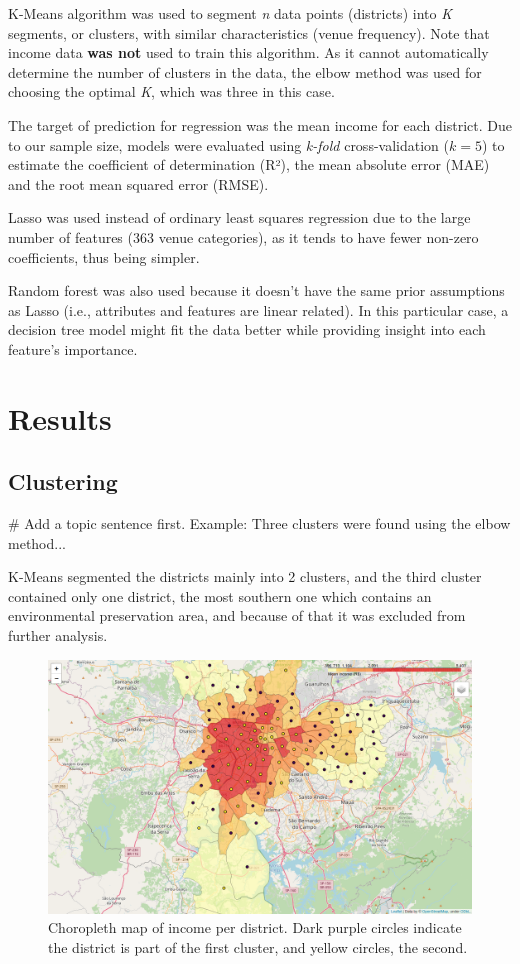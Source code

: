 \documentclass[12pt]{article}
\begin{document}
K-Means algorithm was used to segment \emph{n} data points (districts) into
\emph{K} segments, or clusters, with similar characteristics (venue frequency).
Note that income data \textbf{was not} used to train this algorithm. As it
cannot automatically determine the number of clusters in the data, the elbow
method was used for choosing the optimal \emph{K}, which was three in this
case.


The target of prediction for regression was the mean income for each district.
Due to our sample size, models were evaluated using \emph{k-fold}
cross-validation (\(k=5\)) to estimate the coefficient of determination (R²),
the mean absolute error (MAE) and the root mean squared error (RMSE).

Lasso was used instead of ordinary least squares regression due to the large
number of features (363 venue categories), as it tends to have fewer non-zero
coefficients, thus being simpler.

Random forest was also used because it doesn't have the same prior assumptions as Lasso (i.e., attributes and features are linear related). In this particular case, a decision tree model might fit the data better while providing insight into each feature's importance.


\section{Results}

\subsection{Clustering}

# Add a topic sentence first. Example: Three clusters were found using the elbow method...


K-Means segmented the districts mainly into 2 clusters, and the third cluster
contained only one district, the most southern one which contains an
environmental preservation area, and because of that it was excluded from
further analysis.

\begin{figure}[h]
        \centering
        \includegraphics[width=\linewidth]{map_cluster_labels.png}
        \caption{Choropleth map of income per district. Dark purple circles
        indicate the district is part of the first cluster, and yellow circles,
        the second.\label{fig:map_cluster_labels}}
\end{figure}
\end{document}
